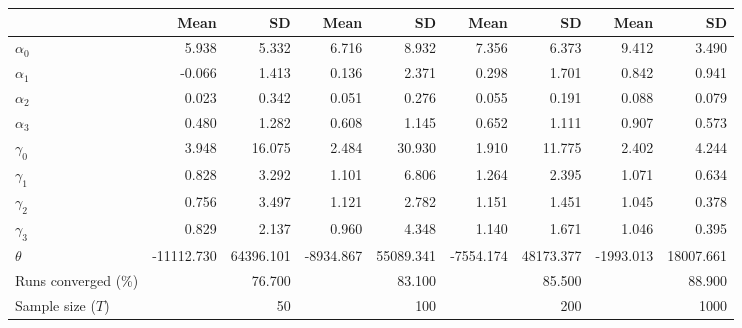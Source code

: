 
\begin{tabular}[t]{lrrrrrrrr}
\toprule
  & Mean & SD & Mean  & SD  & Mean   & SD   & Mean    & SD   \\
\midrule
$\alpha_{0}$ & 5.938 & 5.332 & 6.716 & 8.932 & 7.356 & 6.373 & 9.412 & 3.490\\
$\alpha_{1}$ & -0.066 & 1.413 & 0.136 & 2.371 & 0.298 & 1.701 & 0.842 & 0.941\\
$\alpha_{2}$ & 0.023 & 0.342 & 0.051 & 0.276 & 0.055 & 0.191 & 0.088 & 0.079\\
$\alpha_{3}$ & 0.480 & 1.282 & 0.608 & 1.145 & 0.652 & 1.111 & 0.907 & 0.573\\
$\gamma_{0}$ & 3.948 & 16.075 & 2.484 & 30.930 & 1.910 & 11.775 & 2.402 & 4.244\\
$\gamma_{1}$ & 0.828 & 3.292 & 1.101 & 6.806 & 1.264 & 2.395 & 1.071 & 0.634\\
$\gamma_{2}$ & 0.756 & 3.497 & 1.121 & 2.782 & 1.151 & 1.451 & 1.045 & 0.378\\
$\gamma_{3}$ & 0.829 & 2.137 & 0.960 & 4.348 & 1.140 & 1.671 & 1.046 & 0.395\\
$\theta$ & -11112.730 & 64396.101 & -8934.867 & 55089.341 & -7554.174 & 48173.377 & -1993.013 & 18007.661\\
Runs converged (\%) &  & 76.700 &  & 83.100 &  & 85.500 &  & 88.900\\
Sample size ($T$) &  & 50 &  & 100 &  & 200 &  & 1000\\
\bottomrule
\end{tabular}
